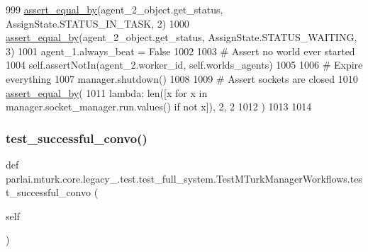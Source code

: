 \begin{DoxyCode}
999         \hyperlink{namespaceparlai_1_1mturk_1_1core_1_1test_1_1test__full__system_a0b463246d35658a2e422010f13dcf819}{assert\_equal\_by}(agent\_2\_object.get\_status, AssignState.STATUS\_IN\_TASK, 2)
1000         \hyperlink{namespaceparlai_1_1mturk_1_1core_1_1test_1_1test__full__system_a0b463246d35658a2e422010f13dcf819}{assert\_equal\_by}(agent\_2\_object.get\_status, AssignState.STATUS\_WAITING, 3)
1001         agent\_1.always\_beat = \textcolor{keyword}{False}
1002 
1003         \textcolor{comment}{# Assert no world ever started}
1004         self.assertNotIn(agent\_2.worker\_id, self.worlds\_agents)
1005 
1006         \textcolor{comment}{# Expire everything}
1007         manager.shutdown()
1008 
1009         \textcolor{comment}{# Assert sockets are closed}
1010         \hyperlink{namespaceparlai_1_1mturk_1_1core_1_1test_1_1test__full__system_a0b463246d35658a2e422010f13dcf819}{assert\_equal\_by}(
1011             \textcolor{keyword}{lambda}: len([x \textcolor{keywordflow}{for} x \textcolor{keywordflow}{in} manager.socket\_manager.run.values() \textcolor{keywordflow}{if} \textcolor{keywordflow}{not} x]), 2, 2
1012         )
1013 
1014 
\end{DoxyCode}
\mbox{\label{classparlai_1_1mturk_1_1core_1_1legacy__2018_1_1test_1_1test__full__system_1_1TestMTurkManagerWorkflows_a296f430cd647d9d0f8f5dd600edd6d36}} 
\subsubsection{\texorpdfstring{test\+\_\+successful\+\_\+convo()}{test\_successful\_convo()}}
{\footnotesize\ttfamily def parlai.\+mturk.\+core.\+legacy\+\_.\+test.\+test\+\_\+full\+\_\+system.\+Test\+M\+Turk\+Manager\+Workflows.\+test\+\_\+successful\+\_\+convo (\begin{DoxyParamCaption}\item[{}]{self }\end{DoxyParamCaption})}



